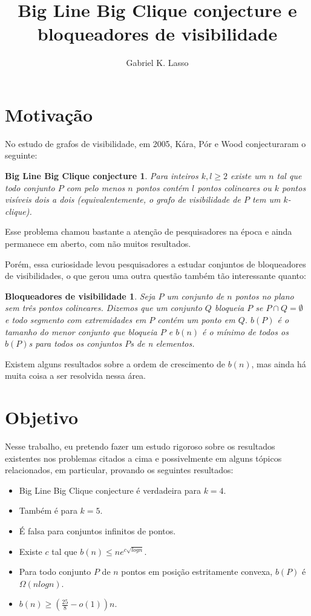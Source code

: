 \documentclass[a4paper]{article}
\title{Big Line Big Clique conjecture e bloqueadores de visibilidade}
\author{Gabriel K. Lasso}
\date{}
\newtheorem*{bigline}{Big Line Big Clique conjecture}
\newtheorem*{bloqueadores}{Bloqueadores de visibilidade}
\begin{document}
\maketitle
\section{Motivação}
No estudo de grafos de visibilidade, em 2005, Kára, Pór e Wood\cite{visibilitygraph} conjecturaram o seguinte:
\begin{bigline}
Para inteiros $k, l\geq 2$ existe um $n$ tal que todo conjunto $P$ com pelo menos $n$ pontos contém $l$ pontos colineares ou $k$ pontos visíveis dois a dois (equivalentemente, o grafo de visibilidade de $P$ tem um $k$-clique).
\end{bigline}
Esse problema chamou bastante a atenção de pesquisadores na época\cite{pentagon, visblock, infinity} e ainda permanece em aberto, com não muitos resultados.

Porém, essa curiosidade levou pesquisadores a estudar conjuntos de bloqueadores de visibilidades, o que gerou uma outra questão também tão interessante quanto:
\begin{bloqueadores}
Seja $P$ um conjunto de $n$ pontos no plano sem três pontos colineares. Dizemos que um conjunto $Q$ bloqueia $P$ se $P\cap Q=\emptyset$ e todo segmento com extremidades em $P$ contém um ponto em $Q$. $b(P)$ é o tamanho do menor conjunto que bloqueia $P$ e $b(n)$ é o mínimo de todos os $b(P)$s para todos os conjuntos $P$s de n elementos.
\end{bloqueadores}
Existem alguns resultados sobre a ordem de crescimento de $b(n)$, mas ainda há muita coisa a ser resolvida nessa área.

\section{Objetivo}
Nesse trabalho, eu pretendo fazer um estudo rigoroso sobre os resultados existentes nos problemas citados a cima e possivelmente em alguns tópicos relacionados, em particular, provando os seguintes resultados:
\begin{itemize}
\item
    Big Line Big Clique conjecture é verdadeira para $k=4$\cite{visibilitygraph}.
\item
    Também é para $k=5$\cite{pentagon}.
\item
    É falsa para conjuntos infinitos de pontos\cite{infinity}.
\item
    Existe $c$ tal que $b(n)\leq ne^{c\sqrt{logn}}$\cite{blockers}.
\item
    Para todo conjunto $P$ de $n$ pontos em posição estritamente convexa, $b(P)$ é $\Omega(nlogn)$\cite{blockers}.
\item
    $b(n)\geq(\frac{25}{8}-o(1))n$\cite{block}.
\end{itemize}


{}
\end{document}
